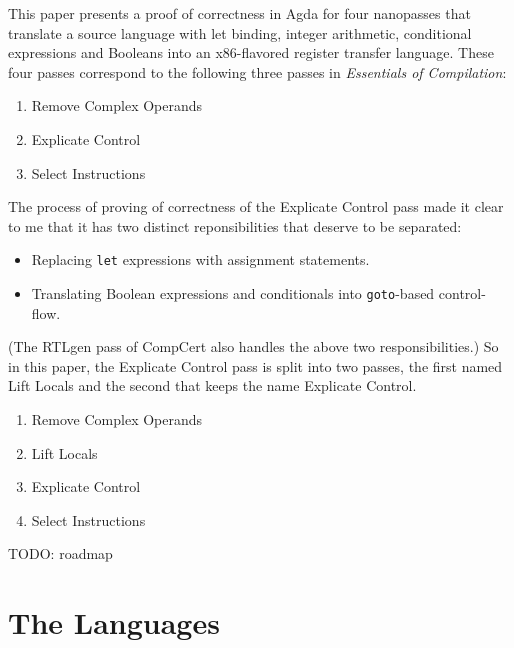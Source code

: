 \documentclass[sigplan,review,dvipsnames,screen,10pt]{acmart}
\begin{document}
This paper presents a proof of correctness in Agda for four nanopasses
that translate a source language with let binding, integer arithmetic,
conditional expressions and Booleans into an x86-flavored register
transfer language. These four passes correspond to the
following three passes in \emph{Essentials of Compilation}:
\begin{enumerate}
\item Remove Complex Operands
\item Explicate Control
\item Select Instructions
\end{enumerate}
The process of proving of correctness of the Explicate Control pass
made it clear to me that it has two distinct reponsibilities that
deserve to be separated:
\begin{itemize}
\item Replacing \texttt{let} expressions with assignment statements.
\item Translating Boolean expressions and conditionals into
  \texttt{goto}-based control-flow.
\end{itemize}
(The RTLgen pass of CompCert also handles the above two
responsibilities.)  So in this paper, the Explicate Control pass is
split into two passes, the first named Lift Locals and the second that
keeps the name Explicate Control.
\begin{enumerate}
\item Remove Complex Operands
\item Lift Locals
\item Explicate Control
\item Select Instructions
\end{enumerate}

TODO: roadmap


\section{The Languages}
\end{document}
